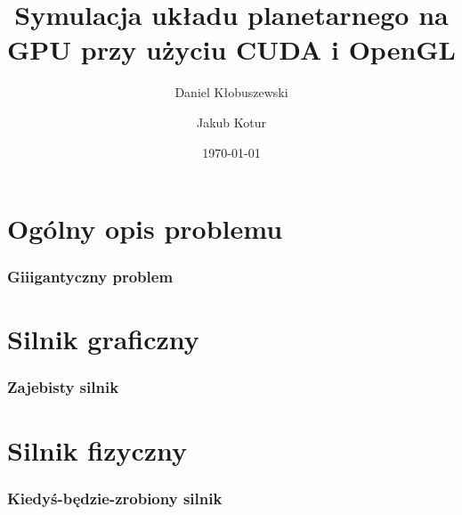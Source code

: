 \documentclass{beamer}
\title{Symulacja układu planetarnego na GPU przy użyciu CUDA i OpenGL}
\author{Daniel Kłobuszewski\and Jakub Kotur}
\institute{Politechnika Warszawska}
\date{\today}
\begin{document}
\frame[plain]{\titlepage}


\section{Ogólny opis problemu}\label{sec:beg}

\frame
{
	\frametitle{Giiigantyczny problem}
}

\section{Silnik graficzny}\label{sec:silnik graficzny}
\frame{ \tableofcontents[currentsection] }

\frame
{
	\frametitle{Zajebisty silnik}
}

\section{Silnik fizyczny}\label{sec:silnik fizyczny}
\frame{ \tableofcontents[currentsection] }

\frame
{
	\frametitle{Kiedyś-będzie-zrobiony silnik}
}



\end{document}
